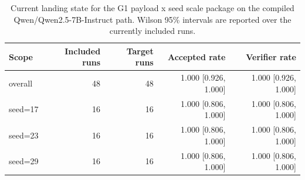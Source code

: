 \begin{table}[t]
\centering
\small
\begin{tabular}{lrrrr}
\toprule
Scope & Included runs & Target runs & Accepted rate & Verifier rate \\
\midrule
overall & 48 & 48 & 1.000 [0.926, 1.000] & 1.000 [0.926, 1.000] \\
seed=17 & 16 & 16 & 1.000 [0.806, 1.000] & 1.000 [0.806, 1.000] \\
seed=23 & 16 & 16 & 1.000 [0.806, 1.000] & 1.000 [0.806, 1.000] \\
seed=29 & 16 & 16 & 1.000 [0.806, 1.000] & 1.000 [0.806, 1.000] \\
\bottomrule
\end{tabular}
\caption{Current landing state for the G1 payload x seed scale package on the compiled Qwen/Qwen2.5-7B-Instruct path. Wilson 95\% intervals are reported over the currently included runs.}
\end{table}
